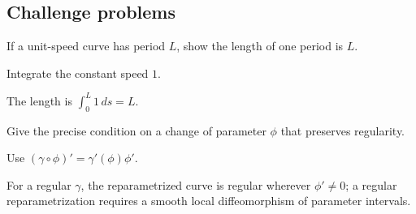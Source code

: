 \subsection*{Challenge problems}

\begin{exercise}\label{exr:vii12-ped-15}
If a unit-speed curve has period \(L\), show the length of one period is \(L\).
\end{exercise}
\begin{hint}
Integrate the constant speed \(1\).
\end{hint}
\begin{solution}
The length is \(\int_0^L1\,ds=L\).
\end{solution}

\begin{exercise}\label{exr:vii12-ped-16}
Give the precise condition on a change of parameter \(\phi\) that preserves regularity.
\end{exercise}
\begin{hint}
Use \((\gamma\circ\phi)'=\gamma'(\phi)\phi'\).
\end{hint}
\begin{solution}
For a regular \(\gamma\), the reparametrized curve is regular wherever \(\phi'\neq0\); a regular reparametrization requires a smooth local diffeomorphism of parameter intervals.
\end{solution}

